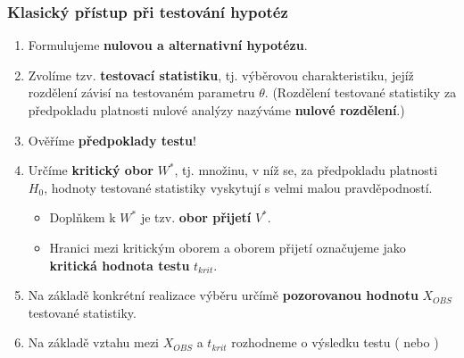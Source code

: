 \subsubsection{Klasický přístup při testování hypotéz}
\begin{enumerate}
	\item Formulujeme \textbf{nulovou a alternativní hypotézu}.
	\item Zvolíme tzv. \textbf{testovací statistiku}, tj. výběrovou charakteristiku, jejíž rozdělení závisí na testovaném parametru $\theta$. (Rozdělení testované statistiky za předpokladu platnosti nulové analýzy nazýváme \textbf{nulové rozdělení}.)
	\item Ověříme \textbf{předpoklady testu}! %
	\item Určíme \textbf{kritický obor} $W^*$, tj. množinu, v níž se, za předpokladu platnosti $H_0$, hodnoty testované statistiky vyskytují s velmi malou pravděpodností.
	\begin{itemize}
		\item Doplňkem k $W^*$ je tzv. \textbf{obor přijetí} $V^*$.
		\item Hranici mezi kritickým oborem a oborem přijetí označujeme jako \textbf{kritická hodnota testu} $t_{krit}$.
	\end{itemize}
	\item Na základě konkrétní realizace výběru určímě \textbf{pozorovanou hodnotu} $X_{OBS}$ testované statistiky. 
	\item Na základě vztahu mezi $X_{OBS}$ a $t_{krit}$ rozhodneme o výsledku testu ( nebo )
\end{enumerate}

